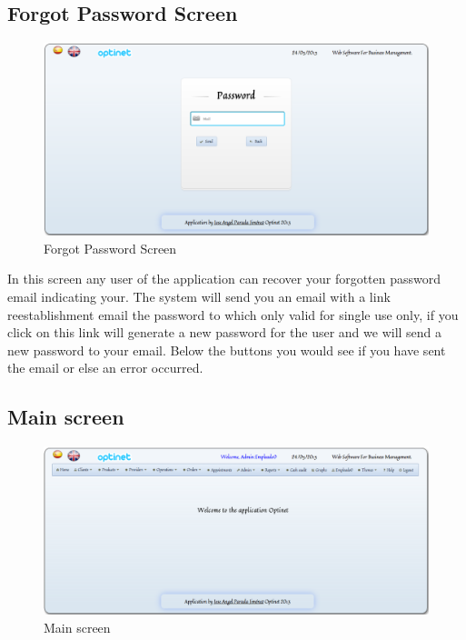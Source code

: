 \documentclass[a4paper,11pt]{book}
\begin{document}
\newpage
\subsection {Forgot Password Screen}

\begin{figure}[!htb]
  \centering
    \includegraphics[scale=0.35]{icapolvidada.png}
  \caption{Forgot Password Screen}
  \label{a}
\end{figure}

In this screen any user of the application can recover your forgotten password email indicating your. The system will send you an email with a link reestablishment email the password to which only valid for single use only, if you click on this link will generate a new password for the user and we will send a new password to your email. Below the buttons you would see if you have sent the email or else an error occurred.

\newpage
\subsection {Main screen}

\begin{figure}[!htb]
  \centering
    \includegraphics[scale=0.35]{icapprincipal.png}
  \caption{Main screen}
  \label{a}
\end{figure}
\end{document}

